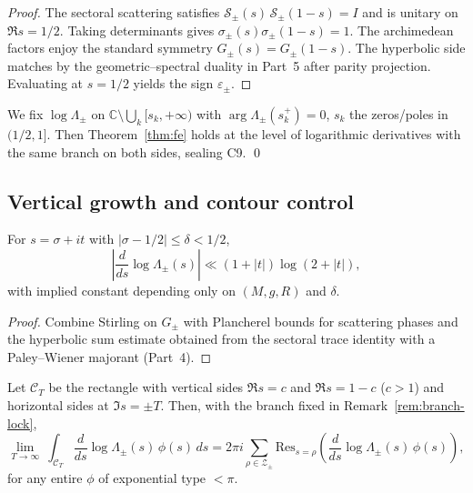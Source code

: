 \begin{proof}
The sectoral scattering satisfies $\mathcal S_\pm(s)\,\mathcal S_\pm(1-s)=I$ and is unitary on $\Re s=1/2$. Taking determinants gives $\sigma_\pm(s)\sigma_\pm(1-s)=1$. The archimedean factors enjoy the standard symmetry $G_\pm(s)=G_\pm(1-s)$. The hyperbolic side matches by the geometric–spectral duality in Part~5 after parity projection. Evaluating at $s=1/2$ yields the sign $\varepsilon_\pm$.  %
\end{proof}

\begin{remark}
\label{rem:branch-lock}
We fix $\log\Lambda_\pm$ on $\mathbb C\setminus\bigcup_k [s_k,+\infty)$ with $\arg\Lambda_\pm(s_k^+)=0$, $s_k$ the zeros/poles in $(1/2,1]$. Then Theorem~\ref{thm:fe} holds at the level of logarithmic derivatives with the same branch on both sides, sealing C9. \qed {} %
\end{remark}


\subsection{Vertical growth and contour control}
\label{subsec:ch6-part7-vertical} \relax \hspace{0pt}
\begin{lemma}
\label{lem:vertical-Lambda}
For $s=\sigma+it$ with $|\sigma-1/2|\le \delta<1/2$,
\[
\left|\frac{d}{ds}\log\Lambda_\pm(s)\right|\ll (1+|t|)\log(2+|t|),
\]
with implied constant depending only on $(M,g,R)$ and $\delta$.  %
\end{lemma}

\begin{proof}
Combine Stirling on $G_\pm$ with Plancherel bounds for scattering phases and the hyperbolic sum estimate obtained from the sectoral trace identity with a Paley–Wiener majorant (Part~4).  %
\end{proof}

\begin{corollary}
\label{cor:horizontal}
Let $\mathcal C_T$ be the rectangle with vertical sides $\Re s=c$ and $\Re s=1-c$ ($c>1$) and horizontal sides at $\Im s=\pm T$. Then, with the branch fixed in Remark~\ref{rem:branch-lock},
\[
\lim_{T\to\infty}\ \int_{\mathcal C_T} \frac{d}{ds}\log\Lambda_\pm(s)\,\phi(s)\,ds
= 2\pi i \sum_{\rho\in\mathcal Z_\pm} \mathrm{Res}_{s=\rho}\!\left(\frac{d}{ds}\log\Lambda_\pm(s)\,\phi(s)\right),
\]
for any entire $\phi$ of exponential type $<\pi$.  %
\end{corollary}

